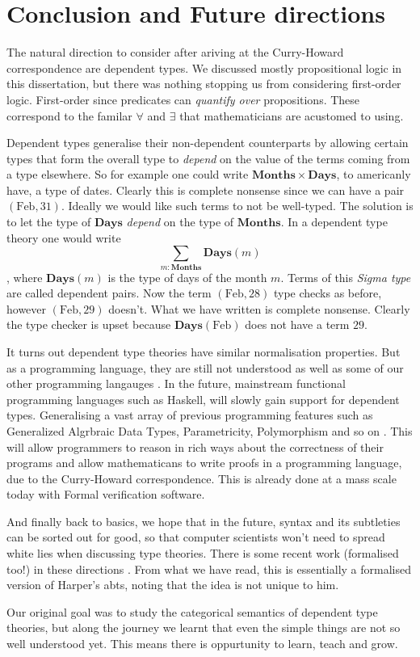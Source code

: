 \section{Conclusion and Future directions}

The natural direction to consider after ariving at the Curry-Howard correspondence are dependent types. We discussed mostly propositional logic in this dissertation, but there was nothing stopping us from considering first-order logic. First-order since predicates can \emph{quantify over} propositions. These correspond to the familar $\forall$ and $\exists$ that mathematicians are acustomed to using.

Dependent types generalise their non-dependent counterparts by allowing certain types that form the overall type to \emph{depend} on the value of the terms coming from a type elsewhere. So for example one could write $\mathbf{Months} \times \mathbf{Days}$, to americanly have, a type of dates. Clearly this is complete nonsense since we can have a pair $(\mathrm{Feb}, 31)$. Ideally we would like such terms to not be well-typed. The solution is to let the type of $\mathbf{Days}$ \emph{depend} on the type of $\mathbf{Months}$. In a dependent type theory one would write $$\sum_{m : \mathbf{Months}} \mathbf{Days}(m)$$, where $\mathbf{Days}(m)$ is the type of days of the month $m$. Terms of this \emph{Sigma type} are called dependent pairs. Now the term $(\mathrm{Feb}, 28)$ type checks as before, however $(\mathrm{Feb}, 29)$ doesn't. What we have written is complete nonsense. Clearly the type checker is upset because $\mathbf{Days}(\mathrm{Feb})$ does not have a term $29$.

It turns out dependent type theories have similar normalisation properties. But as a programming language, they are still not understood as well as some of our other programming langauges \cite{Sorensen, DEBRUIJN1994141, DEBRUIJN1972381}. In the future, mainstream functional programming languages such as Haskell, will slowly gain support for dependent types. Generalising a vast array of previous programming features such as Generalized Algrbraic Data Types, Parametricity, Polymorphism and so on \cite{2016arXiv161007978E}. This will allow programmers to reason in rich ways about the correctness of their programs and allow mathematicans to write proofs in a programming language, due to the Curry-Howard correspondence. This is already done at a mass scale today with Formal verification software.

And finally back to basics, we hope that in the future, syntax and its subtleties can be sorted out for good, so that computer scientists won't need to spread white lies when discussing type theories. There is some recent work (formalised too!) in these directions \cite{Binding_Syntax_Theory}. From what we have read, this is essentially a formalised version of Harper's abts, noting that the idea is not unique to him.

Our original goal was to study the categorical semantics of dependent type theories, but along the journey we learnt that even the simple things are not so well understood yet. This means there is oppurtunity to learn, teach and grow.
